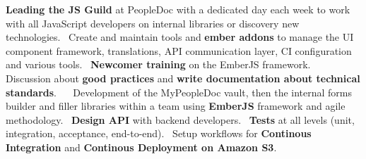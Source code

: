 \documentclass[11pt,a4paper]{moderncv}
\begin{document}
{	\textbf{Leading the JS Guild} at PeopleDoc with a dedicated day each week to work with all JavaScript developers on internal libraries or discovery new technologies.\newline~
	Create and maintain tools and \textbf{ember addons} to manage the UI component framework, translations, API communication layer, CI configuration and various tools.\newline~
	\textbf{Newcomer training} on the EmberJS framework.\newline~
	Discussion about \textbf{good practices} and \textbf{write documentation about technical standards}.\newline~
	\newline~
	Development of the MyPeopleDoc vault, then the internal forms builder and filler libraries within a team using \textbf{EmberJS} framework and agile methodology.\newline~
	\textbf{Design API} with backend developers.\newline~
	\textbf{Tests} at all levels (unit, integration, acceptance, end-to-end).\newline~
	Setup workflows for \textbf{Continous Integration} and \textbf{Continous Deployment on Amazon S3}.
}

\vspace{1.0em}


\vspace{1.0em}

\end{document}
